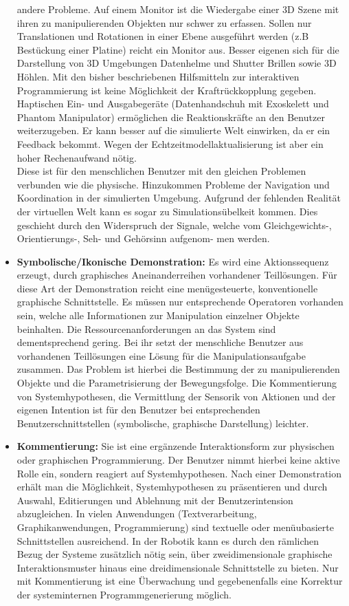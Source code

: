 \begin{itemize}
andere Probleme. Auf einem Monitor ist die Wiedergabe einer 3D Szene mit ihren zu manipulierenden
Objekten nur schwer zu erfassen. Sollen nur Translationen und Rotationen in einer Ebene ausgeführt
werden (z.B Bestückung einer Platine) reicht ein Monitor aus. Besser eigenen sich für die Darstellung
von 3D Umgebungen Datenhelme und Shutter Brillen sowie 3D Höhlen. Mit den
bisher beschriebenen Hilfsmitteln zur interaktiven Programmierung ist keine Möglichkeit
der Kraftrückkopplung gegeben. Haptischen Ein- und
Ausgabegeräte (Datenhandschuh mit Exoskelett und Phantom Manipulator) ermöglichen die Reaktionskräfte
an den Benutzer weiterzugeben. Er kann besser auf die simulierte Welt
einwirken, da er ein Feedback bekommt. Wegen der Echtzeitmodellaktualisierung ist aber
ein hoher Rechenaufwand nötig.\\
Diese ist für den menschlichen Benutzer mit den gleichen
Problemen verbunden wie die physische. Hinzukommen Probleme der Navigation und Koordination
in der simulierten Umgebung. Aufgrund der fehlenden Realität der virtuellen
Welt kann es sogar zu Simulationsübelkeit kommen. Dies geschieht durch den Widerspruch
der Signale, welche vom Gleichgewichts-, Orientierungs-, Seh- und Gehörsinn aufgenom-
men werden.
\item \textbf{Symbolische/Ikonische Demonstration:}
Es wird eine Aktionssequenz erzeugt, durch graphisches Aneinanderreihen vorhandener Teillösungen. 
Für diese Art der Demonstration reicht eine menügesteuerte, konventionelle graphische Schnittstelle.
Es müssen nur entsprechende Operatoren vorhanden sein, welche alle Informationen zur Manipulation
einzelner Objekte beinhalten. Die Ressourcenanforderungen an das System sind dementsprechend gering.
Bei ihr setzt der menschliche Benutzer aus
vorhandenen Teillösungen eine Lösung für die Manipulationsaufgabe zusammen. Das Problem
ist hierbei die Bestimmung der zu manipulierenden Objekte und die Parametrisierung
der Bewegungsfolge.
Die Kommentierung von Systemhypothesen, die Vermittlung der Sensorik von Aktionen
und der eigenen Intention ist für den Benutzer bei entsprechenden Benutzerschnittstellen
(symbolische, graphische Darstellung) leichter.
\item \textbf{Kommentierung:} Sie ist eine ergänzende Interaktionsform zur physischen oder 
graphischen Programmierung. Der Benutzer nimmt hierbei keine aktive Rolle ein, sondern reagiert
auf Systemhypothesen. Nach einer Demonstration erhält man die Möglichkeit, Systemhypothesen zu
präsentieren und durch Auswahl, Editierungen und Ablehnung mit der
Benutzerintension abzugleichen.
In vielen Anwendungen (Textverarbeitung, Graphikanwendungen, Programmierung) sind
textuelle oder menüubasierte Schnittstellen ausreichend. In der Robotik kann es durch den
rämlichen Bezug der Systeme zusätzlich nötig sein, über zweidimensionale graphische
Interaktionsmuster hinaus eine dreidimensionale Schnittstelle zu bieten. Nur mit 
Kommentierung ist eine Überwachung und gegebenenfalls eine Korrektur der systeminternen
Programmgenerierung möglich.
\end{itemize}
